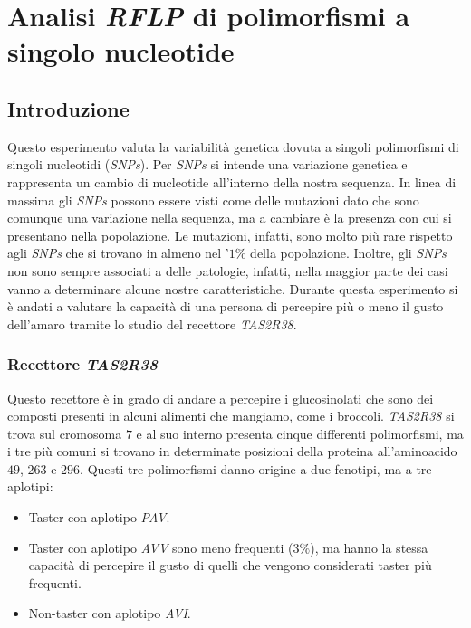 \section*{Analisi \emph{RFLP} di polimorfismi a singolo nucleotide}

	\subsection*{Introduzione}
	Questo esperimento valuta la variabilità genetica dovuta a singoli polimorfismi di singoli nucleotidi (\emph{SNPs}). 
	Per \emph{SNPs} si intende una variazione genetica e rappresenta un cambio di nucleotide all'interno della nostra sequenza. 
	In linea di massima gli \emph{SNPs} possono essere visti come delle mutazioni dato che sono comunque una variazione nella sequenza, ma a cambiare è la presenza con cui si presentano nella popolazione. 
	Le mutazioni, infatti, sono molto più rare  rispetto agli \emph{SNPs} che si trovano in almeno nel '$1\%$ della popolazione. 
	Inoltre, gli \emph{SNPs} non sono sempre associati a delle patologie, infatti, nella maggior parte dei casi vanno a determinare alcune nostre caratteristiche. 
	Durante questa esperimento si è andati a valutare la capacità di una persona di percepire più o meno il gusto dell'amaro tramite lo studio del recettore \emph{TAS2R38}.
		
		\subsubsection*{Recettore \emph{TAS2R38}}
		Questo recettore è in grado di andare a percepire i glucosinolati che sono dei composti presenti in alcuni alimenti che mangiamo, come i broccoli. 
		\emph{TAS2R38} si trova sul cromosoma $7$ e al suo interno presenta cinque differenti polimorfismi, ma i tre più comuni si trovano in determinate posizioni della proteina all'aminoacido $49$, $263$ e $296$. 
		Questi tre polimorfismi danno origine a due fenotipi, ma a tre aplotipi:
		\begin{multicols}{2}
		\begin{itemize}
			\item Taster con aplotipo \emph{PAV}.
			\item Taster con aplotipo \emph{AVV} sono meno frequenti ($3\%$), ma hanno la stessa capacità di percepire il gusto di quelli che vengono considerati taster più frequenti.
			\item Non-taster con aplotipo \emph{AVI}. 
		\end{itemize}
		\end{multicols}
    
